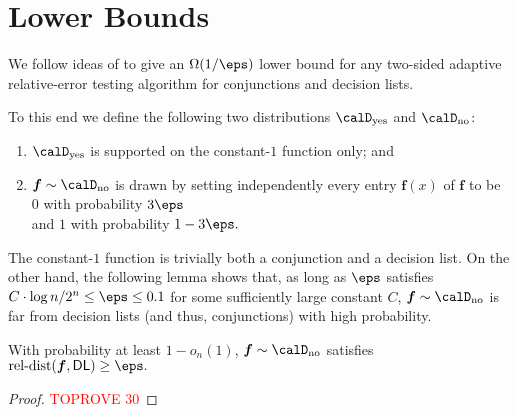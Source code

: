 \documentclass[11pt]{article}
\theoremstyle{definition}
\begin{document}
 
\begin{flushleft}


\end{flushleft}

\appendix




\def\Dyes{\calD_{\textrm{yes}}}
\def\Dno{\calD_{\textrm{no}}}
\def\bff{\boldsymbol{f}}
\section{Lower Bounds}\label{appendix:lower}

We follow ideas of \cite{BshoutyGoldreich022}
  to give an $\Omega(1/\eps)$ lower bound for any two-sided adaptive relative-error testing algorithm for conjunctions and decision lists.

To this end we define the following two distributions $\Dyes$ and $\Dno$:
\begin{flushleft}\begin{enumerate}
    \item $\Dyes$ is supported on the constant-$1$ function only; and \item $\bff\sim\Dno$ is drawn by setting independently every entry $\bff(x)$ of $\bff$ to be $0$ with probability $3\eps$\\ and $1$ with probability $1-3\eps.$
\end{enumerate}\end{flushleft}
The constant-$1$ function is trivially both a conjunction and 
  a decision list.
On the other hand, the following lemma shows that, as long as $\eps$ satisfies $C\cdot {\log n}/2^n\le \eps\le 0.1$ for some sufficiently large constant $C$,  
  $\bff\sim \Dno$ is far from decision lists (and thus, conjunctions) with high probability. 

\begin{lemma}
With probability at least $1-o_n(1)$,
  $\bff\sim \Dno$ satisfies $\reldist(\bff,\textsf{DL})\ge \eps.$
\end{lemma}
\begin{proof}\textcolor{red}{TOPROVE 30}\end{proof}
\end{document}
